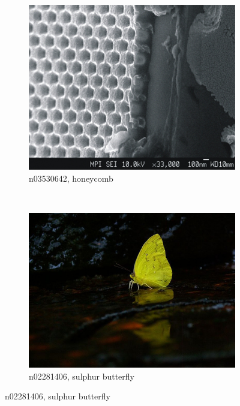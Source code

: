 \documentclass[11pt, a4paper]{article}
\begin{document}
\begin{figure}[h!tb]
\begin{subfigure}[t]{0.30\textwidth}
    		\centering
        \includegraphics[width=\textwidth]{imagenet/examples/n03530642_10006.JPEG}
        \caption{n03530642, honeycomb}
        \label{fig:imagenet-examples-2}
    \end{subfigure}
    ~ %
    \begin{subfigure}[t]{0.30\textwidth}
    		\centering
        \includegraphics[width=\textwidth]{imagenet/examples/n02281406_10006.JPEG}
        \caption{n02281406, sulphur butterfly}
        \label{fig:imagenet-examples-3}
    \end{subfigure}
    

\end{figure}
\end{document}
